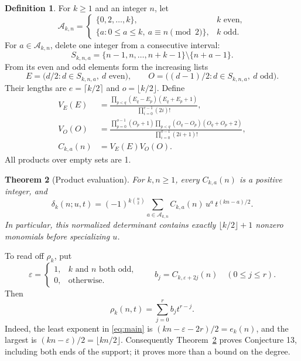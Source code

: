 \documentclass[11pt,letterpaper]{article}
\numberwithin{equation}{section}
\newtheorem{theorem}{Theorem}[section]
\theoremstyle{definition}
\newtheorem{definition}[theorem]{Definition}
\newcommand{\eps}{\varepsilon}
\begin{document}
\begin{definition}\label{def:coeff}
For \(k\ge1\) and an integer \(n\), let
\begin{equation}\label{eq:admissible}
 \mathcal A_{k,n}=
 \begin{cases}
  \{0,2,\ldots,k\},&k\text{ even},\\
  \{a:0\le a\le k,\ a\equiv n\pmod2\},&k\text{ odd}.
 \end{cases}
\end{equation}
For \(a\in\mathcal A_{k,n}\), delete one integer from a consecutive
interval:
\[
 S_{k,n,a}=\{n-1,n,\ldots,n+k-1\}\setminus\{n+a-1\}.
\]
From its even and odd elements form the increasing lists
\[
 E=\bigl(d/2:d\in S_{k,n,a},\ d\text{ even}\bigr),
 \qquad
 O=\bigl((d-1)/2:d\in S_{k,n,a},\ d\text{ odd}\bigr).
\]
Their lengths are \(e=\lceil k/2\rceil\) and \(o=\lfloor k/2\rfloor\).
Define
\begin{align}
 V_E(E)&=
 \frac{\displaystyle\prod_{p<q}(E_q-E_p)(E_q+E_p+1)}
 {\displaystyle\prod_{i=0}^{e-1}(2i)!},\label{eq:VE}\\
 V_O(O)&=
 \frac{\displaystyle\prod_{p=0}^{o-1}(O_p+1)
       \prod_{p<q}(O_q-O_p)(O_q+O_p+2)}
 {\displaystyle\prod_{i=0}^{o-1}(2i+1)!},\label{eq:VO}\\
 C_{k,a}(n)&=V_E(E)V_O(O).\label{eq:C}
\end{align}
All products over empty sets are 1.
\end{definition}

\begin{theorem}[Product evaluation]\label{thm:main}
For \(k,n\ge1\), every \(C_{k,a}(n)\) is a positive integer, and
\begin{equation}\label{eq:main}
 \boxed{\displaystyle
 \delta_k(n;u,t)=(-1)^{k\binom n2}
  \sum_{a\in\mathcal A_{k,n}}
   C_{k,a}(n)\,u^a\,t^{(kn-a)/2}.}
\end{equation}
In particular, this normalized determinant contains exactly
\(\lfloor k/2\rfloor+1\) nonzero monomials before specializing \(u\).
\end{theorem}

To read off \(\rho_k\), put
\[
 \eps=\begin{cases}1,&k\text{ and }n\text{ both odd},\\0,&\text{otherwise}.
 \end{cases}
 \qquad
 b_j=C_{k,\eps+2j}(n)\quad(0\le j\le r).
\]
Then
\begin{equation}\label{eq:rho-b}
 \rho_k(n,t)=\sum_{j=0}^r b_j t^{r-j}.
\end{equation}
Indeed, the least exponent in \eqref{eq:main} is
\((kn-\eps-2r)/2=e_k(n)\), and the largest is
\((kn-\eps)/2=\lfloor kn/2\rfloor\).
Consequently Theorem~\ref{thm:main} proves Conjecture 13, including both
ends of the support; it proves more than a bound on the degree.
\end{document}
